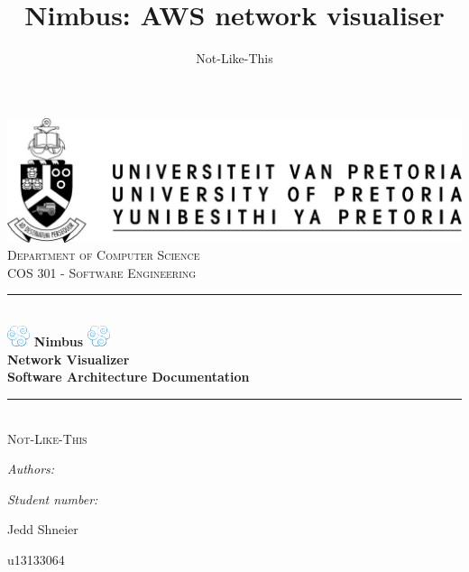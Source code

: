 \documentclass[hidelinks,a4paper,12pt]{article}
\author{Not-Like-This}
\title{ Nimbus: AWS network visualiser}
\newcommand{\HRule}{\rule{\linewidth}{0.5mm}}
\begin{document}
\setlength{\parskip}{6pt}

\begin{titlepage}

\begin{center}
\includegraphics[width=1\textwidth]{./images/up-logo.jpg}\\[0.4cm] 
\textsc{\LARGE Department of Computer Science}\\[1.5cm]
\textsc{\Large COS 301 - Software Engineering}\\[0.5cm]
\HRule \\[0.4cm]
\includegraphics[width=0.05\textwidth]{./images/logo.png} 
{ \huge \bfseries Nimbus}
\includegraphics[width=0.05\textwidth]{./images/logo.png}\\[0.4cm] 
{ \huge \bfseries Network Visualizer}\\[0.4cm]
{ \huge \bfseries Software Architecture Documentation}\\[0.4cm]
\HRule \\[0.4cm]
\textsc{\Large Not-Like-This}\\[0.5cm]
\begin{minipage}{0.4\textwidth}
\begin{flushleft} \large
\emph{Authors:}
\end{flushleft}
\end{minipage}
\begin{minipage}{0.4\textwidth}
\begin{flushright} \large
\emph{Student number:}
\end{flushright}
\end{minipage}

\begin{minipage}{0.4\textwidth}
\begin{flushleft} \large
Jedd {Shneier}
\end{flushleft}
\end{minipage}
\begin{minipage}{0.4\textwidth}
\begin{flushright} \large
\emph{}
u13133064
\end{flushright}
\end{minipage}


\end{center}
\end{titlepage}
\end{document}
